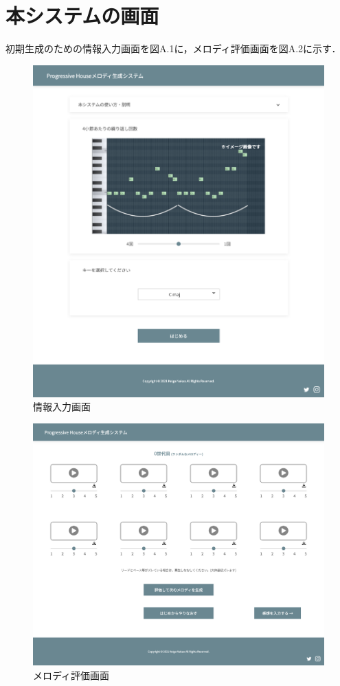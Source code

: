 \chapter{本システムの画面}
初期生成のための情報入力画面を図A.1に，メロディ評価画面を図A.2に示す．

\begin{figure}[htbp]
	\begin{center}
		\includegraphics[width=14.5cm]{image/mainDisplay.png}
		\caption{情報入力画面}
	\end{center}
\end{figure}

\begin{figure}[htbp]
	\begin{center}
		\includegraphics[scale=0.35]{image/subDisplay.png}
		\caption{メロディ評価画面}
	\end{center}
\end{figure}